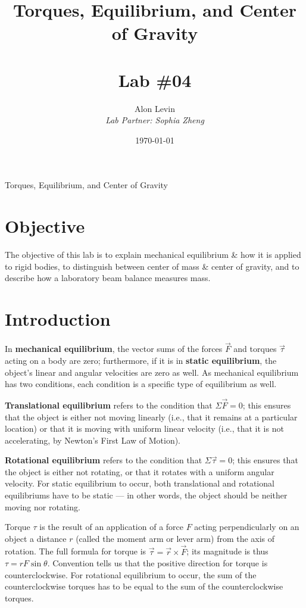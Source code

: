 \documentclass[11pt, titlepage]{article}
\title{\Huge{Torques, Equilibrium, and Center of Gravity} \\ \ \\ \huge Lab \#04}
\author{\Large{Alon Levin} \\ \emph{Lab Partner: Sophia Zheng}}
\date{\today}
\begin{document}
\maketitle

\begin{center}
\LARGE Torques, Equilibrium, and Center of Gravity
\end{center}

\section*{Objective}
The objective of this lab is to explain mechanical equilibrium \& how it is applied to rigid bodies, to distinguish between center of mass \& center of gravity, and to describe how a laboratory beam balance measures mass.

\section*{Introduction}
In \textbf{mechanical equilibrium}, the vector sums of the forces $\vec{F}$ and torques $\vec{\tau}$ acting on a body are zero; furthermore, if it is in \textbf{static equilibrium}, the object's linear and angular velocities are zero as well. As mechanical equilibrium has two conditions, each condition is a specific type of equilibrium as well.

\textbf{Translational equilibrium} refers to the condition that $\Sigma \vec{F} = 0$; this ensures that the object is either not moving linearly (i.e., that it remains at a particular location) or that it is moving with uniform linear velocity (i.e., that it is not accelerating, by Newton's First Law of Motion).

\textbf{Rotational equilibrium} refers to the condition that $\Sigma \vec{\tau} = 0$; this ensures that the object is either not rotating, or that it rotates with a uniform angular velocity. For static equilibrium to occur, both translational and rotational equilibriums have to be static --- in other words, the object should be neither moving nor rotating.

Torque $\tau$ is the result of an application of a force $F$ acting perpendicularly on an object a distance $r$ (called the moment arm or lever arm) from the axis of rotation. The full formula for torque is $\vec{\tau} = \vec{r} \times \vec{F}$; its magnitude is thus $\tau = rF\sin\theta$. Convention tells us that the positive direction for torque is counterclockwise. For rotational equilibrium to occur, the sum of the counterclockwise torques has to be equal to the sum of the counterclockwise torques.
\end{document}
